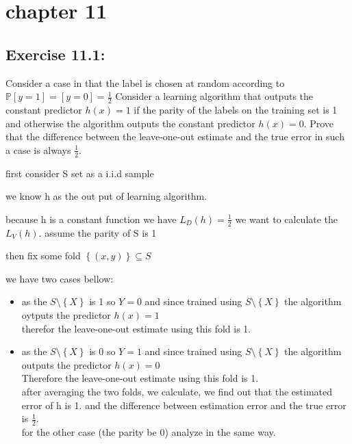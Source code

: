 \documentclass[]{book}
\begin{document}
\section*{chapter 11}
\subsection*{Exercise 11.1:}

Consider a case in that the label is chosen at random according to $\mathbb{P}\left [ y = 1 \right ]= \left [ y=0 \right ]=\frac{1}{2}$ Consider a learning algorithm that outputs the constant predictor $h(x)=1$ if the parity of the labels on the training set is 1 and otherwise the algorithm outputs the
constant predictor $h(x)=0$. Prove that the difference between the leave-one-out estimate and the true error in such a case is always $\frac{1}{2}$.


first consider S set as a i.i.d sample


we know h as the out put of learning algorithm.


because h is a constant function we have $L_{D}(h)=\frac{1}{2}$
we want to calculate the $L_{V}(h)$. assume the parity of S is 1


then fix some fold $\left\{ (x,y)\right\}\subseteq S$


we have two cases bellow:


\begin{itemize}
    \item as the $S \setminus \left\{ X\right\}$ is 1 so $Y=0$ and since trained using $S \setminus \left\{ X\right\}$ the algorithm oytputs the predictor $h(x)=1$\\
therefor the leave-one-out estimate using this fold is 1.\\
    \item as the $S \setminus \left\{ X\right\}$ is 0 so $Y=1$ and since trained using $S \setminus \left\{ X\right\}$ the algorithm outputs the predictor $h(x)=0$\\
Therefore the leave-one-out estimate using this fold is 1.\\
 after averaging the two folds, we calculate, we find out that the estimated error of h is 1. and the difference between estimation error and the true error is $\frac{1}{2}$.\\
 for the other case (the parity be 0) analyze in the same way.

\end{itemize}
\end{document}
